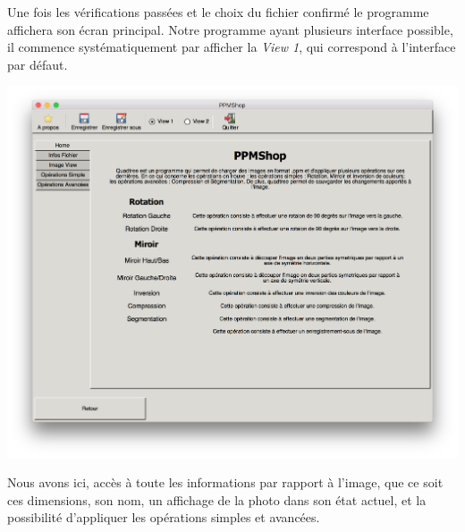 \documentclass[12pt]{article}
\begin{document}
Une fois les vérifications passées et le choix du fichier confirmé le programme affichera son écran principal. Notre programme ayant plusieurs interface possible, il commence systématiquement par afficher la \textit{View 1}, qui correspond à l'interface par défaut.

\begin{center}
\includegraphics[scale = 0.4]{homeView1}\\
\end{center}
Nous avons ici, accès à toute les informations par rapport à l'image, que ce soit ces dimensions, son nom, un affichage de la photo dans son état actuel, et la possibilité d'appliquer les opérations simples et avancées. 
\end{document}
